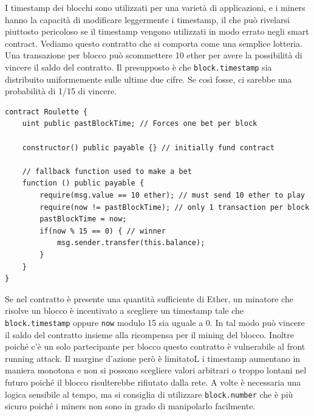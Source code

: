 I timestamp dei blocchi sono utilizzati per una varietà di applicazioni, e i miners hanno la capacità di modificare leggermente i timestamp, il che può rivelarsi piuttosto pericoloso se il timestamp vengono utilizzati in modo errato negli smart contract. Vediamo questo contratto che si comporta come una semplice lotteria. Una transazione per blocco può scommettere 10 ether per avere la possibilità di vincere il saldo del contratto. Il presupposto è che \texttt{block.timestamp} sia distribuito uniformemente sulle ultime due cifre. Se così fosse, ci sarebbe una probabilità di 1/15 di vincere.
\begin{lstlisting}[language=Solidity]
contract Roulette {
    uint public pastBlockTime; // Forces one bet per block
    
    constructor() public payable {} // initially fund contract
    
    // fallback function used to make a bet
    function () public payable {
        require(msg.value == 10 ether); // must send 10 ether to play
        require(now != pastBlockTime); // only 1 transaction per block
        pastBlockTime = now;
        if(now % 15 == 0) { // winner
            msg.sender.transfer(this.balance);
        }
    }
}
\end{lstlisting}
Se nel contratto è presente una quantità sufficiente di Ether, un minatore che risolve un blocco è incentivato a scegliere un timestamp tale che \texttt{block.timestamp} oppure \texttt{now} modulo 15 sia uguale a 0. In tal modo può vincere il saldo del contratto insieme alla ricompensa per il mining del blocco. Inoltre poiché c'è un solo partecipante per blocco questo contratto è vulnerabile al front running attack. Il margine d'azione però è limitatoL i timestamp aumentano in maniera monotona e non si possono scegliere valori arbitrari o troppo lontani nel futuro poiché il blocco risulterebbe rifiutato dalla rete. A volte è necessaria una logica sensibile al tempo, ma si consiglia di utilizzare \texttt{block.number} che è più sicuro poiché i miners non sono in grado di manipolarlo facilmente. 

